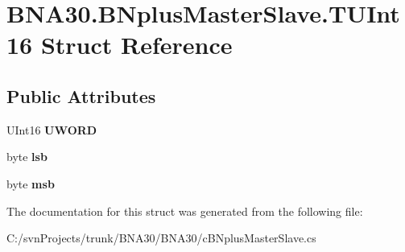 \hypertarget{struct_b_n_a30_1_1_b_nplus_master_slave_1_1_t_u_int16}{}\section{B\+N\+A30.\+B\+Nplus\+Master\+Slave.\+T\+U\+Int16 Struct Reference}
\label{struct_b_n_a30_1_1_b_nplus_master_slave_1_1_t_u_int16}
\subsection*{Public Attributes}
\begin{DoxyCompactItemize}
\item 
\mbox{\label{struct_b_n_a30_1_1_b_nplus_master_slave_1_1_t_u_int16_a4fb03e80e62fc7245e0ad6b77c25bac1}} 
U\+Int16 {\bfseries U\+W\+O\+RD}
\item 
\mbox{\label{struct_b_n_a30_1_1_b_nplus_master_slave_1_1_t_u_int16_a25be8c4915798d1cfd39105d4fda6d1b}} 
byte {\bfseries lsb}
\item 
\mbox{\label{struct_b_n_a30_1_1_b_nplus_master_slave_1_1_t_u_int16_a55cf930e97f3b1afdbca108242e2a5cc}} 
byte {\bfseries msb}
\end{DoxyCompactItemize}


The documentation for this struct was generated from the following file\+:\begin{DoxyCompactItemize}
\item 
C\+:/svn\+Projects/trunk/\+B\+N\+A30/\+B\+N\+A30/c\+B\+Nplus\+Master\+Slave.\+cs\end{DoxyCompactItemize}
